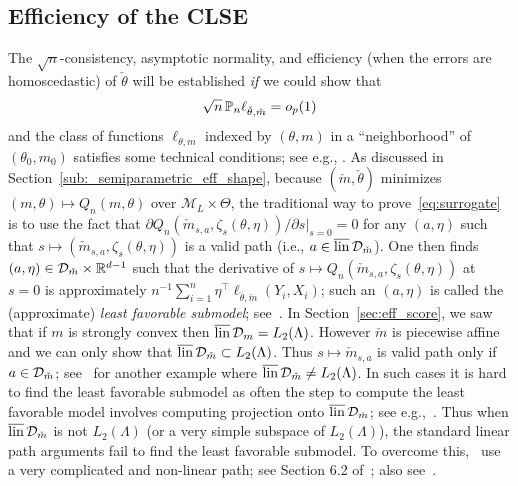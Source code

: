 {\subsection{Efficiency of the CLSE} \label{sec:SemiCLSE}
The $\sqrt{n}$-consistency, asymptotic normality, and  efficiency (when the errors are homoscedastic) of $\check{\theta}$ will be established \textit{if} we could show that 
 \begin{equation}\label{eq:surrogate}
\sqrt{n}\,\mathbb{P}_n \ell_{\check\theta,\check m} = o_{p}(1)
\end{equation}
   and the class of functions $\ell_{\theta,m}$ indexed by  $(\theta, m)$ in a ``neighborhood'' of $(\theta_0,m_0)$ satisfies some technical conditions; see e.g., \citet[Chapter 6.5]{VdV02}.  As discussed in Section~\ref{sub:_semiparametric_eff_shape}, because $(\check{m},\check{\theta})$ minimizes $(m,\theta) \mapsto Q_n(m,\theta)$ over $\mathcal{M}_L\times\Theta$, the traditional way to prove~\eqref{eq:surrogate} is to use the fact that $\partial Q_n(\check{m}_{s,a}, \zeta_s(\theta,\eta))/\partial s|_{s = 0} =0$ for any $(a, \eta)$ such that $s\mapsto (\check{m}_{s,a}, \zeta_s(\theta,\eta))$ is a valid path (i.e., $a\in \overline{\mathrm{lin}}\,\mathcal{D}_{\check{m}}$). One then finds $(a, \eta) \in \mathcal{D}_{\check{m}}\times \mathbb{R}^{d-1}$ such that the derivative of $s\mapsto Q_n(\check{m}_{s,a}, \zeta_s(\theta,\eta))$ at $s=0$  is approximately $n^{-1}\sum_{i=1}^n \eta^\top \ell_{\check{\theta}, \check{m}}(Y_i, X_i)$; such an $(a, \eta)$ is called the  (approximate) \textit{least favorable submodel}; see~\citet[Section 9.2]{VdV02}. In Section~\ref{sec:eff_score}, we saw that if $m$ is strongly convex then $\overline{\mathrm{lin}}\,\mathcal{D}_m = L_2(\Lambda)$. However $\check{m}$ is piecewise affine and we can only show that $\overline{\mathrm{lin}}\,\mathcal{D}_{\check{m}} \subset L_2(\Lambda)$. Thus $s \mapsto \check{m}_{s,a}$ is valid path only if $ a\in \mathcal{D}_{\check{m}}$; see~\cite{VANC} for another example where $\overline{\mathrm{lin}}\,\mathcal{D}_{\check{m}} \neq L_2(\Lambda)$. In such cases it is hard to find the least favorable submodel as often the step to compute the least favorable model involves computing projection onto  $\overline{\mathrm{lin}}\,\mathcal{D}_{\check{m}}$; see e.g.,~\cite{Newey90}. Thus when $\overline{\mathrm{lin}}\,\mathcal{D}_{\check{m}}$ is not $L_2(\Lambda)$ (or a very simple subspace of $L_2(\Lambda)$), the standard linear path arguments fail to find the least favorable submodel.  To overcome this,~\cite{VANC} use a very complicated and non-linear path; see Section 6.2 of~\cite{VANC}; also see~\cite{Patra16}. 



}
